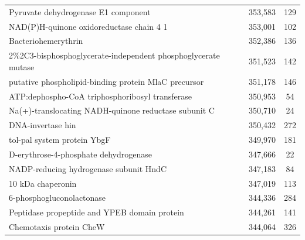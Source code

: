 \begin{singlespace}
\begin{longtable}{p{} cc}
                                                       Pyruvate dehydrogenase E1 component &                     353,583 &           129 \\
                                                  NAD(P)H-quinone oxidoreductase chain 4 1 &                     353,001 &           102 \\
                                                                       Bacteriohemerythrin &                     352,386 &           136 \\
                             2\%2C3-bisphosphoglycerate-independent phosphoglycerate mutase &                     351,523 &           142 \\
                                      putative phospholipid-binding protein MlaC precursor &                     351,178 &           146 \\
                                           ATP:dephospho-CoA triphosphoribosyl transferase &                     350,953 &            54 \\
                                      Na(+)-translocating NADH-quinone reductase subunit C &                     350,710 &            24 \\
                                                                         DNA-invertase hin &                     350,432 &           272 \\
                                                               tol-pal system protein YbgF &                     349,970 &           181 \\
                                                     D-erythrose-4-phosphate dehydrogenase &                     347,666 &            22 \\
                                                    NADP-reducing hydrogenase subunit HndC &                     347,183 &            84 \\
                                                                         10 kDa chaperonin &                     347,019 &           113 \\
                                                                 6-phosphogluconolactonase &                     344,336 &           284 \\
                                              Peptidase propeptide and YPEB domain protein &                     344,261 &           141 \\
                                                                   Chemotaxis protein CheW &                     344,064 &           326 \\

\end{longtable}
\end{singlespace}
